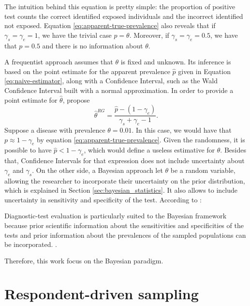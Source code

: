 The intuition behind this equation is pretty simple: the proportion
of positive test counts the correct identified exposed individuals and the
incorrect identified not exposed. Equation \eqref{eq:apparent-true-prevalence}
also reveals that if $\gamma_s = \gamma_e = 1$, we have the trivial 
case $p = \theta$. Moreover, if $\gamma_s = \gamma_e = 0.5$, we have that
$p = 0.5$ and there is no information about $\theta$. 

A frequentist approach assumes that $\theta$ is fixed and unknown. Its
inference is based on the point 
estimate for the apparent prevalence $\hat{p}$ given in Equation
\eqref{eq:naive-estimator}, along with a Confidence Interval, such as the Wald
Confidence Interval built with a normal approximation. In order to provide a 
point estimate for $\hat{\theta}$, \textcite[p. 73]{rogan1978estimating}
propose
\begin{equation}
  \label{eq:rogan-estimate-prevalence}
  \hat{\theta}^{RG} = \frac{\hat{p} - (1-\gamma_e)}{\gamma_s + \gamma_e -
1}.
\end{equation}
Suppose a disease with prevalence $\theta = 0.01$. In this case, we would have
that $p \approx 1 - \gamma_e$ by equation \eqref{eq:apparent-true-prevalence}.
Given the randomness, it is possible to have $\hat{p} < 1 - \gamma_e$, which
would define a useless estimative for $\theta$. Besides that, Confidence Intervals for that 
expression does not include uncertainty about $\gamma_e$ and $\gamma_s$. On
the other side, a Bayesian approach let $\theta$ be a random variable,
allowing the researcher to incorporate their uncertainty on the prior
distribution, which is explained in Section
\ref{sec:bayesian_statistics}. It also allows to include uncertainty in
sensitivity and specificity of the test. According to \textcite{branscum2005estimation}:
\begin{citacao}
  Diagnostic-test evaluation is particularly suited to the
  Bayesian framework because prior scientific information about the
  sensitivities and specificities of the tests and prior information about the prevalences of the sampled
  populations can be incorporated. \cite[p. 1]{branscum2005estimation}.
\end{citacao}

Therefore, this work focus on the Bayesian paradigm.

\section{Respondent-driven sampling}
\label{sec:respodent_driven_sampling}

